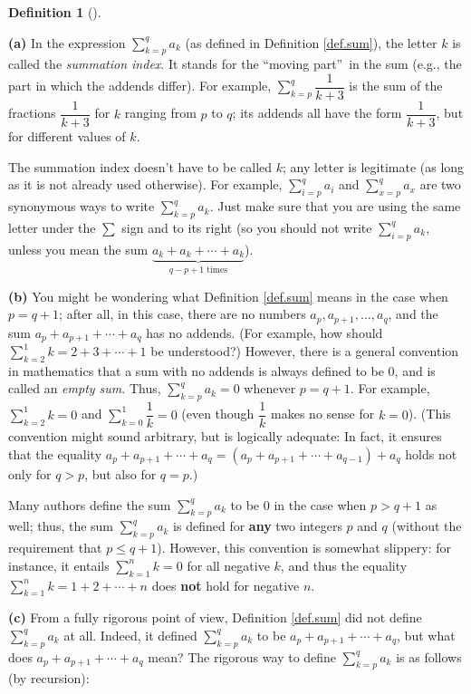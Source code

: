 \documentclass[numbers=enddot,12pt,final,onecolumn,notitlepage]{scrartcl}%
\theoremstyle{definition}
\newtheorem{defi}[theo]{Definition}
\newenvironment{definition}[1][]
{\begin{defi}[#1]\begin{leftbar}}
{\end{leftbar}\end{defi}}
\let\sumnonlimits\sum
\renewcommand{\sum}{\sumnonlimits\limits}
\begin{document}
\begin{definition}
\label{def.sum.2}\textbf{(a)} In the expression $\sum_{k=p}^{q}a_{k}$ (as
defined in Definition \ref{def.sum}), the letter $k$ is called the
\textit{summation index}. It stands for the \textquotedblleft moving
part\textquotedblright\ in the sum (e.g., the part in which the addends
differ). For example, $\sum_{k=p}^{q}\dfrac{1}{k+3}$ is the sum of the
fractions $\dfrac{1}{k+3}$ for $k$ ranging from $p$ to $q$; its addends all
have the form $\dfrac{1}{k+3}$, but for different values of $k$.

The summation index doesn't have to be called $k$; any letter is legitimate
(as long as it is not already used otherwise). For example, $\sum_{i=p}%
^{q}a_{i}$ and $\sum_{x=p}^{q}a_{x}$ are two synonymous ways to write
$\sum_{k=p}^{q}a_{k}$. Just make sure that you are using the same letter under
the $\sum$ sign and to its right (so you should not write $\sum_{i=p}^{q}%
a_{k}$, unless you mean the sum $\underbrace{a_{k}+a_{k}+\cdots+a_{k}%
}_{q-p+1\text{ times}}$).

\textbf{(b)} You might be wondering what Definition \ref{def.sum} means in the
case when $p=q+1$; after all, in this case, there are no numbers
$a_{p},a_{p+1},\ldots,a_{q}$, and the sum $a_{p}+a_{p+1}+\cdots+a_{q}$ has no
addends. (For example, how should $\sum_{k=2}^{1}k=2+3+\cdots+1$ be
understood?) However, there is a general convention in mathematics that a sum
with no addends is always defined to be $0$, and is called an \textit{empty
sum}. Thus, $\sum_{k=p}^{q}a_{k}=0$ whenever $p=q+1$. For example, $\sum
_{k=2}^{1}k=0$ and $\sum_{k=0}^{1}\dfrac{1}{k}=0$ (even though $\dfrac{1}{k}$
makes no sense for $k=0$). (This convention might sound arbitrary, but is
logically adequate: In fact, it ensures that the equality $a_{p}%
+a_{p+1}+\cdots+a_{q}=\left(  a_{p}+a_{p+1}+\cdots+a_{q-1}\right)  +a_{q}$
holds not only for $q>p$, but also for $q=p$.)

Many authors define the sum $\sum_{k=p}^{q}a_{k}$ to be $0$ in the case when
$p>q+1$ as well; thus, the sum $\sum_{k=p}^{q}a_{k}$ is defined for
\textbf{any} two integers $p$ and $q$ (without the requirement that $p\leq
q+1$). However, this convention is somewhat slippery: for instance, it entails
$\sum_{k=1}^{n}k=0$ for all negative $k$, and thus the equality $\sum
_{k=1}^{n}k=1+2+\cdots+n$ does \textbf{not} hold for negative $n$.

\textbf{(c)} From a fully rigorous point of view, Definition \ref{def.sum} did
not define $\sum_{k=p}^{q}a_{k}$ at all. Indeed, it defined $\sum_{k=p}%
^{q}a_{k}$ to be $a_{p}+a_{p+1}+\cdots+a_{q}$, but what does $a_{p}%
+a_{p+1}+\cdots+a_{q}$ mean? The rigorous way to define $\sum_{k=p}^{q}a_{k}$
is as follows (by recursion):


\end{definition}
\end{document}
